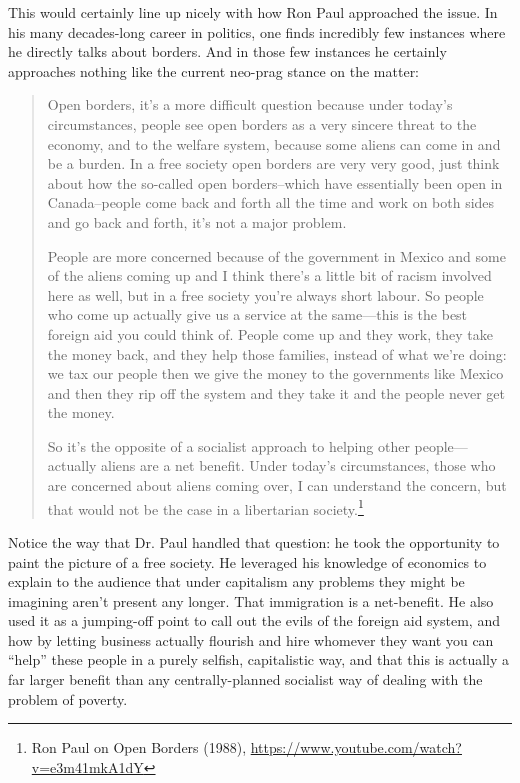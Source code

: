 \documentclass[11pt]{article}
\begin{document}
This would certainly line up nicely with how Ron Paul approached the issue. In his many decades-long career in politics, one finds incredibly few instances where he directly talks about borders. And in those few instances he certainly approaches nothing like the current neo-prag stance on the matter:
\begin{quote}
Open borders, it's a more difficult question because under today's circumstances, people see open borders as a very sincere threat to the economy, and to the welfare system, because some aliens can come in and be a burden. In a free society open borders are very very good, just think about how the so-called open borders--which have essentially been open in Canada--people come back and forth all the time and work on both sides and go back and forth, it's not a major problem.

People are more concerned because of the government in Mexico and some of the aliens coming up and I think there's a little bit of racism involved here as well, but in a free society you're always short labour. So people who come up actually give us a service at the same---this is the best foreign aid you could think of. People come up and they work, they take the money back, and they help those families, instead of what we're doing: we tax our people then we give the money to the governments like Mexico and then they rip off the system and they take it and the people never get the money.

So it's the opposite of a socialist approach to helping other people---actually aliens are a net benefit. Under today's circumstances, those who are concerned about aliens coming over, I can understand the concern, but that would not be the case in a libertarian society.\footnote{Ron Paul on Open Borders (1988), \url{https://www.youtube.com/watch?v=e3m41mkA1dY}}
\end{quote}

Notice the way that Dr. Paul handled that question: he took the opportunity to paint the picture of a free society. He leveraged his knowledge of economics to explain to the audience that under capitalism any problems they might be imagining aren't present any longer. That immigration is a net-benefit. He also used it as a jumping-off point to call out the evils of the foreign aid system, and how by letting business actually flourish and hire whomever they want you can ``help'' these people in a purely selfish, capitalistic way, and that this is actually a far larger benefit than any centrally-planned socialist way of dealing with the problem of poverty.
\end{document}
